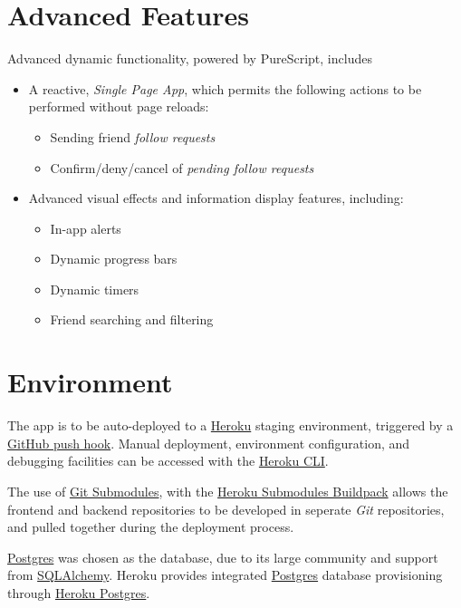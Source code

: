 \documentclass[11pt,a4paper]{report}
\begin{document}
\section{Advanced Features}

Advanced dynamic functionality, powered by PureScript, includes

\begin{itemize}
    \item A reactive, \textit{Single Page App}, which permits the following actions to be performed without page reloads:
        \begin{itemize}
            \item Sending friend \textit{follow requests}
            \item Confirm/deny/cancel of \textit{pending follow requests}
        \end{itemize}
    \item Advanced visual effects and information display features, including:
        \begin{itemize}
            \item In-app alerts
            \item Dynamic progress bars
            \item Dynamic timers
            \item Friend searching and filtering
        \end{itemize}
\end{itemize}

\section{Environment}

The app is to be auto-deployed to a \href{https://www.heroku.com/}{Heroku} staging environment, triggered by a \href{https://devcenter.heroku.com/articles/github-integration}{GitHub push hook}. Manual deployment, environment configuration, and debugging facilities can be accessed with the \href{https://devcenter.heroku.com/articles/heroku-cli}{Heroku CLI}.

The use of \href{https://git-scm.com/book/en/v2/Git-Tools-Submodules}{Git Submodules}, with the \href{https://github.com/dmathieu/heroku-buildpack-submodules}{Heroku Submodules Buildpack} allows the frontend and backend repositories to be developed in seperate \textit{Git} repositories, and pulled together during the deployment process.

\href{https://www.postgresql.org/}{Postgres} was chosen as the database, due to its large community and support from \href{https://www.sqlalchemy.org/}{SQLAlchemy}. Heroku provides integrated \href{https://www.postgresql.org/}{Postgres} database provisioning through \href{https://www.heroku.com/postgres}{Heroku Postgres}.
\end{document}

